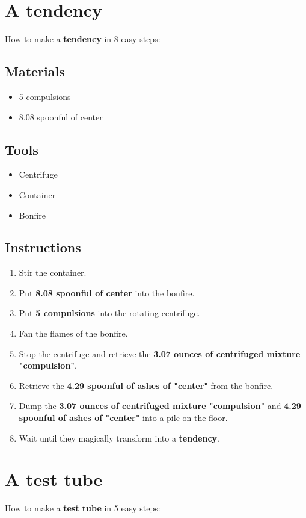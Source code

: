 \documentclass{article}
\begin{document}
\section{A tendency}How to make a \textbf{tendency} in 8 easy steps:

\subsection{Materials}\begin{itemize}
\item 
5 compulsions
\item 
8.08 spoonful of center
\end{itemize}
\subsection{Tools}\begin{itemize}
\item 
Centrifuge
\item 
Container
\item 
Bonfire
\end{itemize}
\subsection{Instructions}\begin{enumerate}
\item 
Stir the container.
\item 
Put \textbf{8.08 spoonful of center} into the bonfire.
\item 
Put \textbf{5 compulsions} into the rotating centrifuge.
\item 
Fan the flames of the bonfire.
\item 
Stop the centrifuge and retrieve the \textbf{3.07 ounces of centrifuged mixture "compulsion"}.
\item 
Retrieve the \textbf{4.29 spoonful of ashes of "center"} from the bonfire.
\item 
Dump the \textbf{3.07 ounces of centrifuged mixture "compulsion"} and \textbf{4.29 spoonful of ashes of "center"} into a pile on the floor.
\item 
Wait until they magically transform into a \textbf{tendency}.
\end{enumerate}
\newpage
\section{A test tube}How to make a \textbf{test tube} in 5 easy steps:
\end{document}
